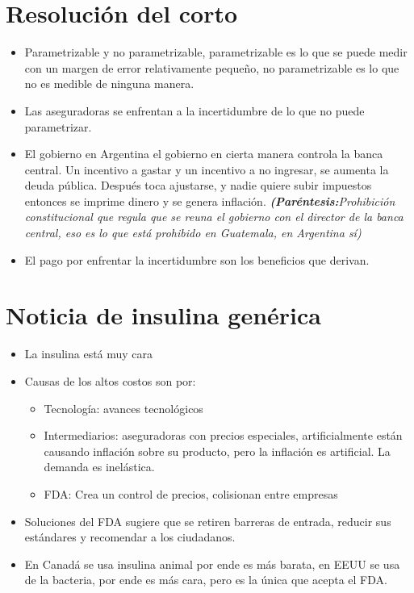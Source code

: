 \section{Resolución del corto}
\begin{itemize}
    \item Parametrizable y no parametrizable, parametrizable es lo que se puede medir con un margen de error relativamente pequeño, no parametrizable es lo que no es medible de ninguna manera.
    \item Las aseguradoras se enfrentan a la incertidumbre de lo que no puede parametrizar.
    \item El gobierno en Argentina el gobierno en cierta manera controla la banca central. Un incentivo a gastar y un incentivo a no ingresar, se aumenta la deuda pública. Después toca ajustarse, y nadie quiere subir impuestos entonces se imprime dinero y se genera inflación. \emph{\textbf{(Paréntesis:}Prohibición constitucional que regula que se reuna el gobierno con el director de la banca central, eso es lo que está prohibido en Guatemala, en Argentina sí)}
    \item El pago por enfrentar la incertidumbre son los beneficios que derivan.
\end{itemize}

\section{Noticia de insulina genérica}
\begin{itemize}
    \item La insulina está muy cara
    \item Causas de los altos costos son por:
    \begin{itemize}
        \item Tecnología: avances tecnológicos
        \item Intermediarios: aseguradoras con precios especiales, artificialmente están causando inflación sobre su producto, pero la inflación es artificial. La demanda es inelástica.
        \item FDA: Crea un control de precios, colisionan entre empresas
    \end{itemize}
    
    \item Soluciones del FDA sugiere que se retiren barreras de entrada, reducir sus estándares y recomendar a los ciudadanos.
    \item En Canadá se usa insulina animal por ende es más barata, en EEUU se usa de la bacteria, por ende es más cara, pero es la única que acepta el FDA.
\end{itemize}

